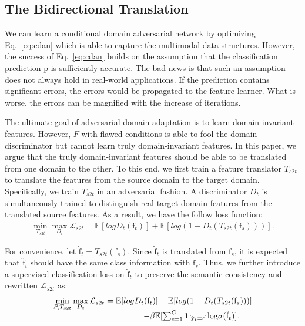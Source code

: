 \documentclass[sigconf]{acmart}
\begin{document}
\subsection{The Bidirectional Translation}
We can learn a conditional domain adversarial network by optimizing Eq.~\eqref{eq:cdan} which is able to capture the multimodal data structures. However, the success of Eq.~\eqref{eq:cdan} builds on the assumption that the classification prediction $\mathrm{p}$ is sufficiently accurate. The bad news is that such an assumption does not always hold in real-world applications. If the prediction contains significant errors, the errors would be propagated to the feature learner. What is worse, the errors can be magnified with the increase of iterations. 

The ultimate goal of adversarial domain adaptation is to learn domain-invariant features. However, $F$ with flawed conditions is able to fool the domain discriminator but cannot learn truly domain-invariant features. In this paper, we argue that the truly domain-invariant features should be able to be translated from one domain to the other. To this end, we first train a feature translator $T_{s2t}$ to translate the features from the source domain to the target domain. Specifically, we train $T_{s2t}$ in an adversarial fashion. A discriminator $D_t$ is simultaneously trained to distinguish real target domain features from the translated source features. As a result, we have the follow loss function:
\begin{equation}
\label{eq:ts2t1}
  \begin{array}{l}
 \min\limits_{T_{s2t}}\max\limits_{D_t} \mathcal{L}_{s2t}= \mathbb{E}[logD_t(\mathrm{f}_t)]+\mathbb{E}[log(1-D_t(T_{s2t}(\mathrm{f}_s)))].
\end{array} 
\end{equation} 

For convenience, let $\hat{\mathrm f}_t=T_{s2t}(\mathrm{f}_s)$. Since $\hat{\mathrm f}_t$ is translated from $\mathrm{f}_s$, it is expected that $\hat{\mathrm f}_t$ should have the same class information with $\mathrm{f}_s$. Thus, we further introduce a supervised classification loss on $\hat{\mathrm f}_t$ to preserve the semantic consistency and rewritten $\mathcal{L}_{s2t}$ as:
\begin{equation}
\label{eq:ts2t2}
  \begin{array}{l}
 \min\limits_{P,T_{s2t}}\max\limits_{D_t} \mathcal{L}_{s2t}= \mathbb{E}[logD_t(\mathrm{f}_t)]+\mathbb{E}[log(1-D_t(T_{s2t}(\mathrm{f}_s)))] \\ ~~~~~~~~~~~~~~~\hspace{60pt}- \beta \mathbb{E}[\sum_{c=1}^{C}{\bf 1}_{[\hat{\mathrm y}_t=c]}\mathrm{log} \sigma(\hat{\mathrm f}_t)].
\end{array} 
\end{equation}
\end{document}
